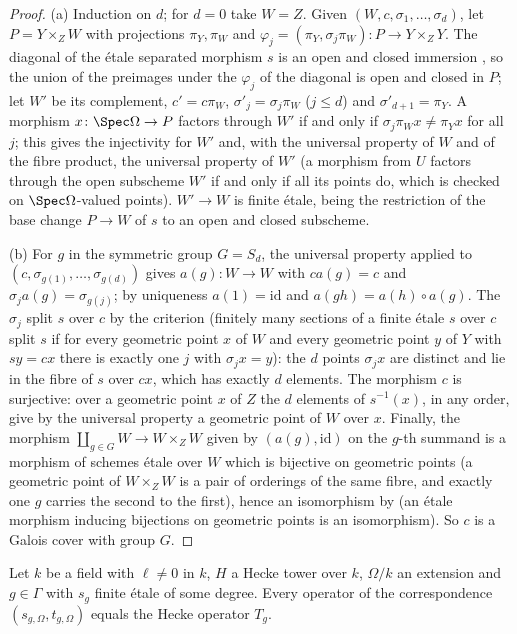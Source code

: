 \begin{proof}
(a) Induction on $d$; for $d=0$ take $W=Z$. Given $(W,c,\sigma_1,\dots,\sigma_d)$, let
$P=Y\times_ZW$ with projections $\pi_Y,\pi_W$ and $\varphi_j=(\pi_Y,\sigma_j\pi_W)\colon P\to
Y\times_ZY$. The diagonal of the \'etale separated morphism $s$ is an open and closed immersion
\cite[17.4.2]{Grothendieck1967}, so the union of the preimages under the $\varphi_j$ of the diagonal is open
and closed in $P$; let $W'$ be its complement, $c'=c\pi_W$, $\sigma'_j=\sigma_j\pi_W$ ($j\le d$) and
$\sigma'_{d+1}=\pi_Y$. A morphism $x\colon\Spec\Omega\to P$ factors through $W'$ if and only if
$\sigma_j\pi_Wx\ne\pi_Yx$ for all $j$; this gives the injectivity for $W'$ and, with the universal
property of $W$ and of the fibre product, the universal property of $W'$ (a morphism from $U$ factors
through the open subscheme $W'$ if and only if all its points do, which is checked on
$\Spec\Omega$-valued points). $W'\to W$ is finite \'etale, being the restriction of the base change
$P\to W$ of $s$ to an open and closed subscheme.

(b) For $g$ in the symmetric group $G=S_d$, the universal property applied to
$(c,\sigma_{g(1)},\dots,\sigma_{g(d)})$ gives $a(g)\colon W\to W$ with $ca(g)=c$ and
$\sigma_ja(g)=\sigma_{g(j)}$; by uniqueness $a(1)=\mathrm{id}$ and $a(gh)=a(h)\circ a(g)$. The $\sigma_j$
split $s$ over $c$ by the criterion  (finitely many
sections of a finite \'etale $s$ over $c$ split $s$ if for every geometric point $x$ of $W$ and every
geometric point $y$ of $Y$ with $sy=cx$ there is exactly one $j$ with $\sigma_jx=y$): the $d$ points
$\sigma_jx$ are distinct and lie in the fibre of $s$ over $cx$, which has exactly $d$ elements. The
morphism $c$ is surjective: over a geometric point $x$ of $Z$ the $d$ elements of $s^{-1}(x)$, in any
order, give by the universal property a geometric point of $W$ over $x$. Finally, the morphism
$\coprod_{g\in G}W\to W\times_ZW$ given by $(a(g),\mathrm{id})$ on the $g$-th summand is a morphism of
schemes \'etale over $W$ which is bijective on geometric points (a geometric point of $W\times_ZW$ is a
pair of orderings of the same fibre, and exactly one $g$ carries the second to the first), hence an
isomorphism by  (an \'etale morphism inducing bijections on
geometric points is an isomorphism). So $c$ is a Galois cover with group $G$.
\end{proof}

\begin{lemma}\label{lem:pf:steps2:opuniq}
Let $k$ be a field with $\ell\ne0$ in $k$, $H$ a Hecke tower over $k$, $\Omega/k$ an extension and
$g\in\Gamma$ with $s_g$ finite \'etale of some degree. Every operator of the correspondence
$(s_{g,\Omega},t_{g,\Omega})$ equals the Hecke operator $T_g$.
\end{lemma}

